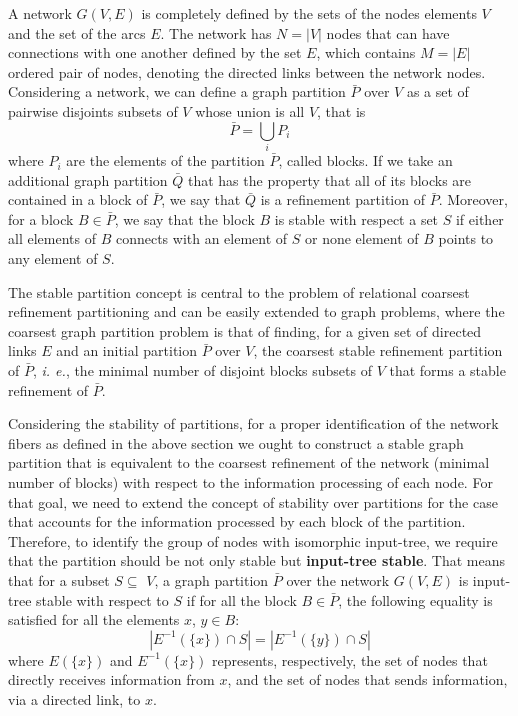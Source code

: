 \documentclass[12pt]{diazessay} %
\begin{document}
A network $G(V, E)$ is completely defined by the sets of the nodes elements $V$ and the set of the arcs $E$. The network has $N = |V|$ nodes that can have connections with one another defined by the set $E$, which contains $M = |E|$ ordered pair of nodes, denoting the directed links between the network nodes. Considering a network, we can define a graph partition $\bar{P}$ over $V$ as a set of pairwise disjoints subsets of $V$ whose union is all $V$, that is
\begin{equation}
	\bar{P} = \bigcup_{i} P_i
\end{equation}
where $P_i$ are the elements of the partition $\bar{P}$, called blocks. If we take an additional graph partition $\bar{Q}$ that has the property that all of its blocks are contained in a block of $\bar{P}$, we say that $\bar{Q}$ is a refinement partition of $\bar{P}$. Moreover, for a block $B \in \bar{P}$, we say that the block $B$ is stable with respect a set $S$ if either all elements of $B$ connects with an element of $S$ or none element of $B$ points to any element of $S$.

The stable partition concept is central to the problem of relational coarsest refinement partitioning and can be easily extended to graph problems, where the coarsest graph partition problem is that of finding, for a given set of directed links $E$ and an initial partition $\bar{P}$ over $V$, the coarsest stable refinement partition of $\bar{P}$, \textit{i. e.}, the minimal number of disjoint blocks subsets of $V$ that forms a stable refinement of $\bar{P}$. 

Considering the stability of partitions, for a proper identification of the network fibers as defined in the above section we ought to construct a stable graph partition that is equivalent to the coarsest refinement of the network (minimal number of blocks) with respect to the information processing of each node. For that goal, we need to extend the concept of stability over partitions for the case that accounts for the information processed by each block of the partition. Therefore, to identify the group of nodes with isomorphic input-tree, we require that the partition should be not only stable but \textbf{input-tree stable}. That means that for a subset $S \subseteq$ $V$, a graph partition $\bar{P}$ over the network $G(V, E)$ is input-tree stable with respect to $S$ if for all the block $B \in \bar{P}$, the following equality is satisfied for all the elements $x$, $y \in B$:
\begin{equation}
	| E^{-1}(\{x\}) \cap S | = | E^{-1}(\{y\}) \cap S |
\end{equation}
where $E(\{x\})$ and $E^{-1}(\{x\})$ represents, respectively, the set of nodes that directly receives information from $x$, and the set of nodes that sends information, via a directed link, to $x$. 
\end{document}
